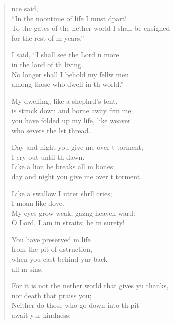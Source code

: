 \settowidth{\versewidth}{To the gates of the nether world I shall be con\-signed *}
\begin{verse}%
  \begin{patverse}
    nce  said,\Med\\
“In the noontime of life I must dpart!\\
To the gates of the nether world I shall be cn\-signed\Med\\
for the rest of m years.”

I said, “I shall see the Lord n more\Med\\
in the land of th living.\\
No longer shall I behold my fellw men\Med\\
among those who dwell in th world.”

My dwelling, like a shephrd’s tent,\Med\\
is struck down and borne away frm me;\\
you have folded up my life, like  weaver\Med\\
who severs the lst thread.

Day and night you give me over t torment;\Med\\
I cry out until th dawn.\\
Like a lion he breaks all m bones;\Med\\
day and night you give me over t torment.

Like a swallow I utter shr\pointup{\i}ll cries;\Med\\
I moan like  dove.\\
My eyes grow weak, gaz\pointup{\i}ng heaven-ward:\Med\\
O Lord, I am in straits; be m surety!

You have preserved m life\Med\\
from the pit of dstruction,\\
when you cast behind yur back\Med\\
all m sins.

For it is not the nether world that gives yu thanks,\Med\\
nor death that praiss you;\\
Neither do those who go down into th pit\Med\\
await yur kindness.


\end{patverse}
\end{verse}

